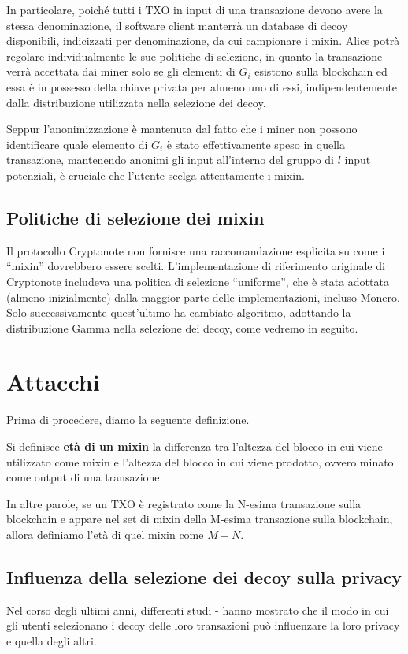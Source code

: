 In particolare, poiché tutti i TXO in input di una transazione devono avere la stessa denominazione, il software client manterrà un database di decoy disponibili, indicizzati per denominazione, da cui campionare i mixin. Alice potrà regolare individualmente le sue politiche di selezione, in quanto la transazione verrà accettata dai miner solo se gli elementi di \(G_i\) esistono sulla blockchain ed essa è in possesso della chiave privata per almeno uno di essi, indipendentemente dalla distribuzione utilizzata nella selezione dei decoy.

Seppur l'anonimizzazione è mantenuta dal fatto che i miner non possono identificare quale elemento di \(G_i\) è stato effettivamente speso in quella transazione, mantenendo anonimi gli input all'interno del gruppo di \(l\) input potenziali, è cruciale che l'utente scelga attentamente i mixin.

\subsection{Politiche di selezione dei mixin}
Il protocollo Cryptonote non fornisce una raccomandazione esplicita su come i “mixin” dovrebbero essere scelti. L'implementazione di riferimento originale di Cryptonote includeva una politica di selezione “uniforme”, che è stata adottata (almeno inizialmente) dalla maggior parte delle implementazioni, incluso Monero. Solo successivamente quest'ultimo ha cambiato algoritmo, adottando la distribuzione Gamma nella selezione dei decoy, come vedremo in seguito.

\section{Attacchi}
Prima di procedere, diamo la seguente definizione.

\begin{definition}
Si definisce \textbf{età di un mixin} la differenza tra l'altezza del blocco in cui viene utilizzato come mixin e l'altezza del blocco in cui viene prodotto, ovvero minato come output di una transazione. 
\end{definition}
In altre parole, se un TXO è registrato come la N-esima transazione sulla blockchain e appare nel set di mixin della M-esima transazione sulla blockchain, allora definiamo l'età di quel mixin come \( M - N \).

\subsection{Influenza della selezione dei decoy sulla privacy}
Nel corso degli ultimi anni, differenti studi \cite{art:4}-\cite{art:5} hanno mostrato che il modo in cui gli utenti selezionano i decoy delle loro transazioni può influenzare la loro privacy e quella degli altri.

